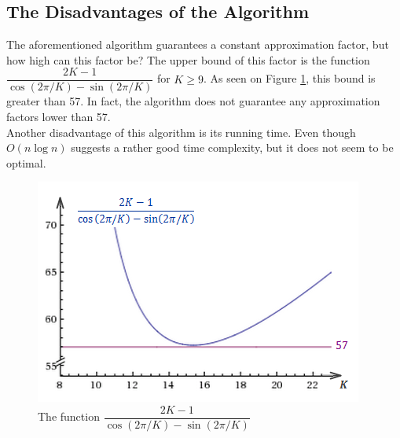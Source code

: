 \documentclass{cccg12}
\begin{document}
\subsection{The Disadvantages of the Algorithm}
The aforementioned algorithm guarantees a constant approximation factor, but how high can this factor be? The upper bound of this factor is the function
{\small${ \dfrac{2K-1}{\cos(2\pi/K)-\sin(2\pi/K)} }$}
for ${ K\geq 9 }$. As seen on Figure \ref{fig:function}, this bound is greater than 57. In fact, the algorithm does not guarantee any approximation factors lower than 57.\\
Another disadvantage of this algorithm is its running time. Even though ${ O(n\log n) }$ suggests a rather good time complexity, but it does not seem to be optimal.
\begin{figure}[h]
  \centering
  \includegraphics[scale=.5]{Figs/fig3.png}
  \caption{The function {\small${ \dfrac{2K-1}{\cos(2\pi/K)-\sin(2\pi/K)} }$} }
  \label{fig:function}
\end{figure}
\end{document}
